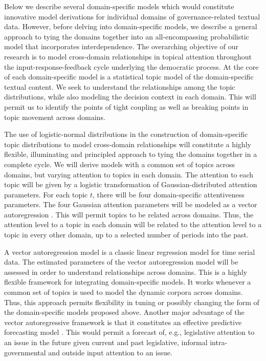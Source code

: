 Below we describe several domain-specific models which would constitute innovative model derivations for individual domains of governance-related textual data. However, before delving into domain-specific models, we describe a general approach to tying the domains together into an all-encompassing probabilistic model that incorporates interdependence. The overarching objective of our research is to model cross-domain relationships in topical attention throughout the input-response-feedback cycle underlying the democratic process. At the core of each domain-specific model is a statistical topic model of the domain-specific textual content. We seek to understand the relationships among the topic distributions, while also modeling the decision context in each domain. This will permit us to identify the points of tight coupling as well as breaking points in topic movement across domains.

The use of logistic-normal distributions in the construction of domain-specific topic distributions to model cross-domain relationships will constitute a highly flexible, illuminating and principled approach to tying the domains together in a complete cycle. We will derive models with a common set of topics across domains, but varying attention to topics in each domain. The attention to each topic will be given by a logistic transformation of Gaussian-distributed attention parameters. For each topic $t$, there will be four domain-specific attentiveness parameters. The four Gaussian attention parameters will be modeled as a vector autoregression \cite{Banbura2010}. This will permit topics to be related across domains. Thus, the attention level to a topic in each domain will be related to the attention level to a topic in every other domain, up to a selected number of periods into the past. 

A vector autoregression model is a classic linear regression model for time serial data. The estimated parameters of the vector autoregression model will be assessed in order to understand relationships across domains. This is a highly flexible framework for integrating domain-specific models. It works whenever a common set of topics is used to model the dynamic corpora across domains. Thus, this approach permits flexibility in tuning or possibly changing the form of the domain-specific models proposed above. Another major advantage of the vector autoregressive framework is that it constitutes an effective predictive forecasting model \cite{Banbura2010}. This would permit a forecast of, e.g., legislative attention to an issue in the future given current and past legislative, informal intra-governmental and outside input attention to an issue.

